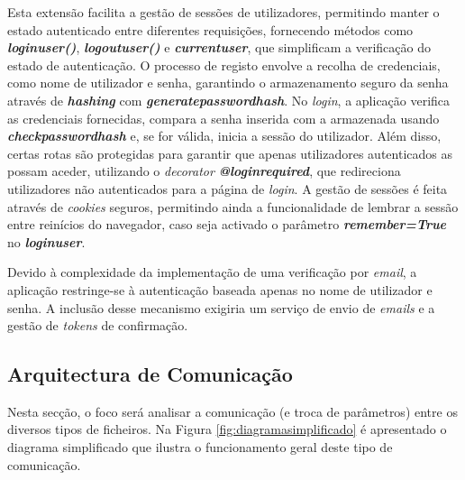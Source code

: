 Esta extensão facilita a gestão de sessões de utilizadores, permitindo manter o estado autenticado entre diferentes requisições, fornecendo métodos como \textbf{\textit{login\textunderscore user()}}, \textbf{\textit{logout\textunderscore user()}} e \textbf{\textit{current\textunderscore user}}, que simplificam a verificação do estado de autenticação. O processo de registo envolve a recolha de credenciais, como nome de utilizador e senha, garantindo o armazenamento seguro da senha através de \textbf{\textit{hashing}} com \textbf{\textit{generate\textunderscore password\textunderscore hash}}. No \textit{login}, a aplicação verifica as credenciais fornecidas, compara a senha inserida com a armazenada usando \textbf{\textit{check\textunderscore password\textunderscore hash}} e, se for válida, inicia a sessão do utilizador. Além disso, certas rotas são protegidas para garantir que apenas utilizadores autenticados as possam aceder, utilizando o \textit{decorator} \textbf{\textit{@login\textunderscore required}}, que redireciona utilizadores não autenticados para a página de \textit{login}. A gestão de sessões é feita através de \textit{cookies} seguros, permitindo ainda a funcionalidade de lembrar a sessão entre reinícios do navegador, caso seja activado o parâmetro \textbf{\textit{remember=True}} no \textbf{\textit{login\textunderscore user}}. 

Devido à complexidade da implementação de uma verificação por \textit{email}, a aplicação restringe-se à autenticação baseada apenas no nome de utilizador e senha. A inclusão desse mecanismo exigiria um serviço de envio de \textit{emails} e a gestão de \textit{tokens} de confirmação.

\subsection{Arquitectura de Comunicação}
\label{sec:comunicacao}
Nesta secção, o foco será analisar a comunicação (e troca de parâmetros) entre os diversos tipos de ficheiros. Na Figura \ref{fig:diagramasimplificado} é apresentado o diagrama simplificado que ilustra o funcionamento geral deste tipo de comunicação. 

